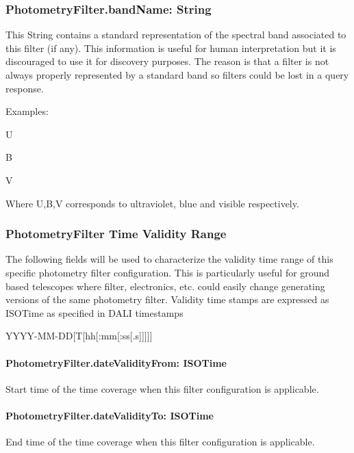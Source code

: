 \documentclass[11pt,a4paper]{ivoa}
\begin{document}
\subsubsection{PhotometryFilter.bandName: String}
This String contains a standard representation of the spectral band
associated to this filter (if any). This information is useful for human
interpretation but it is discouraged to use it for discovery purposes. The
reason is that a filter is not always properly represented by a standard
band so filters could be lost in a query response.
\par

Examples:
\par


U \par B  \par V
\bigskip


Where U,B,V corresponds to ultraviolet, blue and visible respectively.
\par

\subsubsection{PhotometryFilter Time Validity Range}
The following fields will be used to characterize the validity time range of
this specific photometry filter configuration. This is particularly useful
for ground based telescopes where filter, electronics, etc. could easily
change generating versions of the same photometry filter.
Validity time stamps are expressed as ISOTime as specified in DALI \citep{2017ivoa.spec.0517D}
timestamps\par
YYYY-MM-DD[T[hh[:mm[:ss[.s]]]]]
\bigskip

\paragraph{PhotometryFilter.dateValidityFrom: ISOTime}
Start time of the time coverage when this filter configuration is
applicable.

\paragraph{PhotometryFilter.dateValidityTo: ISOTime}
End time of the time coverage when this filter configuration is
applicable.
\end{document}
